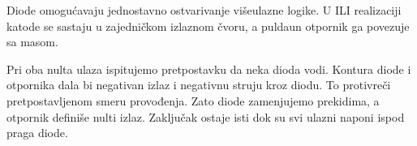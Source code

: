Diode omogućavaju jednostavno ostvarivanje višeulazne logike. U ILI realizaciji katode se sastaju u zajedničkom izlaznom čvoru, a puldaun otpornik ga povezuje sa masom.

Pri oba nulta ulaza ispitujemo pretpostavku da neka dioda vodi. Kontura diode i otpornika dala bi negativan izlaz i negativnu struju kroz diodu. To protivreči pretpostavljenom smeru provođenja. Zato diode zamenjujemo prekidima, a otpornik definiše nulti izlaz. Zaključak ostaje isti dok su svi ulazni naponi ispod praga diode.
